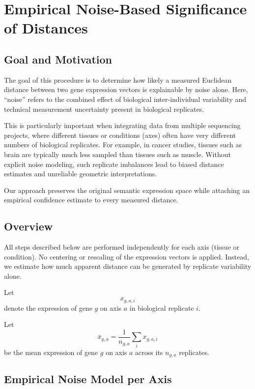 \section{Empirical Noise-Based Significance of Distances}\label{sec:noise_distances}

    \subsection{Goal and Motivation}

        The goal of this procedure is to determine how likely a measured Euclidean distance between two gene expression vectors is explainable by noise alone. Here, ``noise'' refers to the combined effect of biological inter-individual variability and technical measurement uncertainty present in biological replicates.

        This is particularly important when integrating data from multiple sequencing projects, where different tissues or conditions (axes) often have very different numbers of biological replicates. For example, in cancer studies, tissues such as brain are typically much less sampled than tissues such as muscle. Without explicit noise modeling, such replicate imbalances lead to biased distance estimates and unreliable geometric interpretations.

        Our approach preserves the original semantic expression space while attaching an empirical confidence estimate to every measured distance.

    \subsection{Overview}

        All steps described below are performed independently for each axis (tissue or condition). No centering or rescaling of the expression vectors is applied. Instead, we estimate how much apparent distance can be generated by replicate variability alone.

        Let
        \[
            x_{g,a,i}
        \]
        denote the expression of gene $g$ on axis $a$ in biological replicate $i$.

        Let
        \[
            \bar{x}_{g,a} = \frac{1}{n_{g,a}} \sum_i x_{g,a,i}
        \]
        be the mean expression of gene $g$ on axis $a$ across its $n_{g,a}$ replicates.

    \subsection{Empirical Noise Model per Axis}

